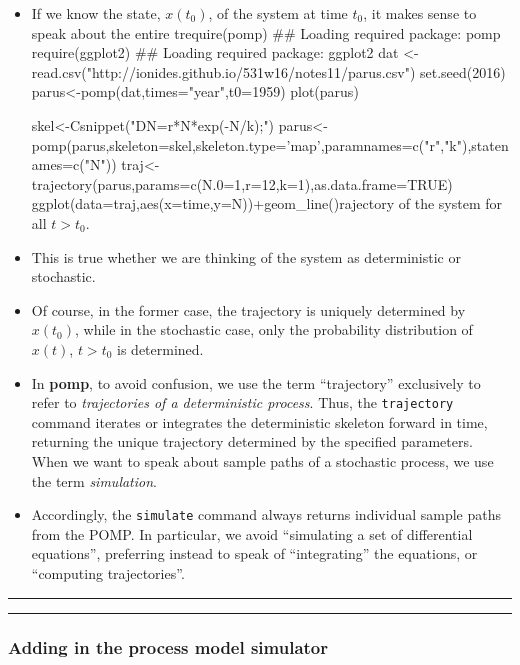 \documentclass[]{article}
\begin{document}
\begin{itemize}
\item
  If we know the state, \(x(t_0)\), of the system at time \(t_0\), it
  makes sense to speak about the entire trequire(pomp)
  \#\# Loading required package: pomp
  require(ggplot2)
  \#\# Loading required package: ggplot2
  dat <- read.csv("http://ionides.github.io/531w16/notes11/parus.csv")
  set.seed(2016)
  parus<-pomp(dat,times="year",t0=1959)
  plot(parus)
  
  
  skel<-Csnippet("DN=r*N*exp(-N/k);")
  parus<-pomp(parus,skeleton=skel,skeleton.type='map',paramnames=c("r","k"),statenames=c("N"))
  traj<-trajectory(parus,params=c(N.0=1,r=12,k=1),as.data.frame=TRUE)
  ggplot(data=traj,aes(x=time,y=N))+geom\_line()rajectory of the system for all
  \(t>t_0\).
\item
  This is true whether we are thinking of the system as deterministic or
  stochastic.
\item
  Of course, in the former case, the trajectory is uniquely determined
  by \(x(t_0)\), while in the stochastic case, only the probability
  distribution of \(x(t)\), \(t>t_0\) is determined.
\item
  In \textbf{pomp}, to avoid confusion, we use the term ``trajectory''
  exclusively to refer to \emph{trajectories of a deterministic
  process}. Thus, the \texttt{trajectory} command iterates or integrates
  the deterministic skeleton forward in time, returning the unique
  trajectory determined by the specified parameters. When we want to
  speak about sample paths of a stochastic process, we use the term
  \emph{simulation}.
\item
  Accordingly, the \texttt{simulate} command always returns individual
  sample paths from the POMP. In particular, we avoid ``simulating a set
  of differential equations'', preferring instead to speak of
  ``integrating'' the equations, or ``computing trajectories''.
\end{itemize}

\begin{center}\rule{0.5\linewidth}{\linethickness}\end{center}

\begin{center}\rule{0.5\linewidth}{\linethickness}\end{center}

\subsubsection{Adding in the process model
simulator}\label{adding-in-the-process-model-simulator}
\end{document}

